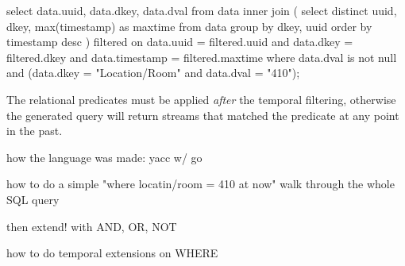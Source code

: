 \begin{sqlcode}
select data.uuid, data.dkey, data.dval
from data
inner join
(
    select distinct uuid, dkey, max(timestamp) as maxtime 
    from data 
    group by dkey, uuid order by timestamp desc
) filtered
on 
    data.uuid = filtered.uuid 
    and data.dkey = filtered.dkey 
    and data.timestamp = filtered.maxtime
where data.dval is not null
and (data.dkey = "Location/Room" and data.dval = "410");
\end{sqlcode}

The relational predicates must be applied \emph{after} the temporal filtering,
otherwise the generated query will return streams that matched the predicate at
any point in the past.


how the language was made:
yacc w/ go

how to do a simple "where locatin/room = 410 at now"
walk through the whole SQL query

then extend! with AND, OR, NOT

how to do temporal extensions on WHERE

\fi
